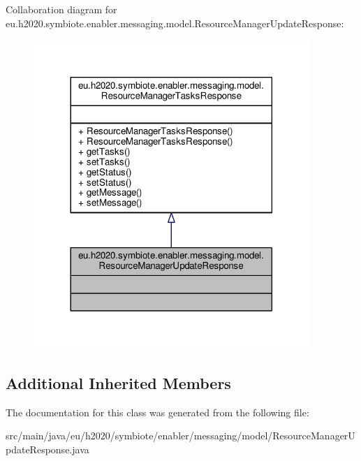 Collaboration diagram for eu.\+h2020.\+symbiote.\+enabler.\+messaging.\+model.\+Resource\+Manager\+Update\+Response\+:\nopagebreak
\begin{figure}[H]
\begin{center}
\leavevmode
\includegraphics[width=296pt]{classeu_1_1h2020_1_1symbiote_1_1enabler_1_1messaging_1_1model_1_1ResourceManagerUpdateResponse__coll__graph}
\end{center}
\end{figure}
\subsection*{Additional Inherited Members}


The documentation for this class was generated from the following file\+:\begin{DoxyCompactItemize}
\item 
src/main/java/eu/h2020/symbiote/enabler/messaging/model/Resource\+Manager\+Update\+Response.\+java\end{DoxyCompactItemize}
